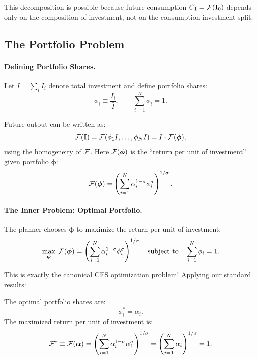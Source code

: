 This decomposition is possible because future consumption $C_1 = \mathcal{F}(\mathbf{I}_0)$ depends only on the composition of investment, not on the consumption-investment split.

\subsection{The Portfolio Problem}
\label{subsec:ac-het-portfolio}

\paragraph{Defining Portfolio Shares.}
Let $\bar{I} = \sum_i I_i$ denote total investment and define portfolio shares:
\begin{equation}
\phi_i \equiv \frac{I_i}{\bar{I}}, \qquad \sum_{i=1}^{N} \phi_i = 1.
\label{eq:ac-het-shares}
\end{equation}

Future output can be written as:
\begin{equation}
\mathcal{F}(\mathbf{I}) = \mathcal{F}(\phi_1 \bar{I}, \ldots, \phi_N \bar{I}) = \bar{I} \cdot \mathcal{F}(\boldsymbol{\phi}),
\label{eq:ac-het-F-homog}
\end{equation}
using the homogeneity of $\mathcal{F}$. Here $\mathcal{F}(\boldsymbol{\phi})$ is the ``return per unit of investment'' given portfolio $\boldsymbol{\phi}$:
\begin{equation}
\mathcal{F}(\boldsymbol{\phi}) = \left( \sum_{i=1}^{N} \alpha_i^{1-\sigma} \phi_i^{\sigma} \right)^{1/\sigma}.
\label{eq:ac-het-F-phi}
\end{equation}

\paragraph{The Inner Problem: Optimal Portfolio.}
The planner chooses $\boldsymbol{\phi}$ to maximize the return per unit of investment:
\begin{equation}
\max_{\boldsymbol{\phi}} \; \mathcal{F}(\boldsymbol{\phi}) = \left( \sum_{i=1}^{N} \alpha_i^{1-\sigma} \phi_i^{\sigma} \right)^{1/\sigma} \quad \text{subject to} \quad \sum_{i=1}^{N} \phi_i = 1.
\label{eq:ac-het-inner}
\end{equation}

This is exactly the canonical CES optimization problem! Applying our standard results:

\begin{proposition}
\label{prop:ac-het-portfolio}
The optimal portfolio shares are:
\begin{equation}
\phi_i^* = \alpha_i.
\label{eq:ac-het-phi-star}
\end{equation}
The maximized return per unit of investment is:
\begin{equation}
\mathcal{F}^* \equiv \mathcal{F}(\boldsymbol{\alpha}) = \left( \sum_{i=1}^{N} \alpha_i^{1-\sigma} \alpha_i^{\sigma} \right)^{1/\sigma} = \left( \sum_{i=1}^{N} \alpha_i \right)^{1/\sigma} = 1.
\label{eq:ac-het-F-star}
\end{equation}
\end{proposition}

